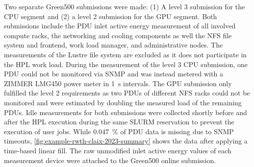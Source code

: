 Two separate Green500 submissions were made: (1) A level 3 submission for the CPU segment and (2) a level 2 submission for the GPU segment.
Both submissions include the \ac{PDU} inlet active energy measurement of all involved compute racks, the networking and cooling components as well the NFS file system and frontend, work load manager, and administrative nodes.
The measurements of the Lustre file system are excluded as it does not participate in the \acs{HPL} work load.
During the measurement of the level 3 CPU submission, one \ac{PDU} could not be monitored via \ac{SNMP} and was instead metered with a ZIMMER LMG450 power meter in \SI{1}{\second} intervals.
The GPU submission only fulfilled the level 2 requirements as two \acp{PDU} of different NFS racks could not be monitored and were estimated by doubling the measured load of the remaining \acp{PDU}.
Idle measurements for both submissions were collected shortly before and after the HPL execution during the same SLURM reservation to prevent the execution of user jobs.
While \SI{0.047}{\percent} of \ac{PDU} data is missing due to \ac{SNMP} timeouts, \cref{fig:example-rwth-claix-2023-summary} shows the data after applying a time-based linear fill.
The raw unmodified inlet active energy values of each measurement device were attached to the Green500 online submission.

